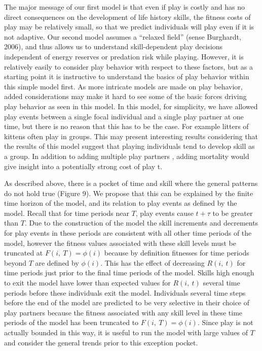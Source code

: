 \documentclass[12pt, letterpaper, fleqn]{article}
\begin{document}
%
The major message of our first model is that even if play is costly and has no direct consequences on the development of life history skills, the fitness costs of play may be relatively small, so that we predict individuals will play even if it is not adaptive. 
%
Our second model assumes a “relaxed field” {\color{red}(sense Burghardt, 2006)}, and thus allows us to understand skill-dependent play decisions independent of energy reserves or predation risk while playing. 
%
However, it is relatively easily to consider play behavior with respect to these factors, but as a starting point it is instructive to understand the basics of play behavior within this simple model first. 
%
As more intricate models are made on play behavior, added considerations may make it hard to see some of the basic forces driving play behavior as seen in this model. 
%
In this model, for simplicity, we have allowed play events between a single focal individual and a single play partner at one time, but there is no reason that this has to be the case. 
%
For example litters of kittens often play in groups. 
%
This may present interesting results considering that the results of this model suggest that playing individuals tend to develop skill as a group. 
%
In addition to adding multiple play partners , adding mortality would give insight into a potentially strong cost of play t.

%
%

%
As described above, there is a pocket of time and skill where the general patterns do not hold true (Figure 9). 
%
We propose that this can be explained by the finite time horizon of the model, and its relation to play events as defined by the model. 
%
Recall that for time periods near $T$, play events cause $t + \tau$ to be greater than $T$. 
%
Due to the construction of the model the skill increments and decrements for play events in these periods are consistent with all other time periods of the model, however the fitness values associated with these skill levels must be truncated at $F(i,~T) = \phi(i)$ because by definition fitnesses for time periods beyond $T$ are defined by $\phi(i)$. 
%
This has the effect of decreasing $R(i,~t)$ for time periods just prior to the final time periods of the model. 
%
Skills high enough to exit the model have lower than expected values for $R(i,~t)$ several time periods before these individuals exit the model. 
%
Individuals several time steps before the end of the model are predicted to be very selective in their choice of play partners because the fitness associated with any skill level in these time periods of the model has been truncated to $F(i,~T) = \phi(i)$. 
%
Since play is not actually bounded in this way, it is useful to run the model with large values of $T$ and consider the general trends prior to this exception pocket.
\end{document}
